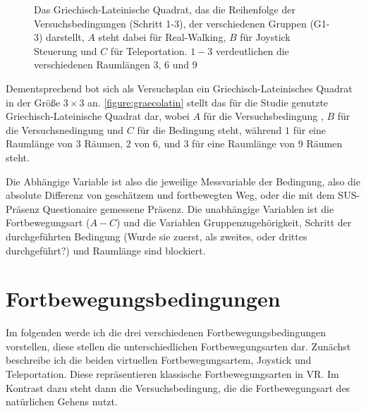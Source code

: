     \begin{figure}[!h]
        \centering
        

        \caption{Das Griechisch-Lateinische Quadrat, das die Reihenfolge der Versuchsbedingungen (Schritt 1-3), der verschiedenen Gruppen (G1-3) darstellt, $A$ steht dabei für Real-Walking, $B$ für Joystick Steuerung und $C$ für Teleportation. $1-3$ verdeutlichen die verschiedenen Raumlängen $3$, $6$ und $9$}\label{figure:graecolatin}
    \end{figure}

    Dementsprechend bot sich als Versuchsplan ein Griechisch-Lateinisches Quadrat in der Größe $3 \times 3$ an. \autoref{figure:graecolatin} stellt das für die Studie genutzte Griechisch-Lateinische Quadrat dar, wobei $A$ für die Versuchsbedingung , $B$ für die Versuchsnedingung  und $C$ für die Bedingung  steht, während $1$ für eine Raumlänge von 3 Räumen, $2$ von 6, und $3$ für eine Raumlänge von 9 Räumen steht.

    Die Abhängige Variable ist also die jeweilige Messvariable der Bedingung, also die absolute Differenz von geschätzem und fortbewegten Weg, oder die mit dem SUS-Präsenz Questionaire gemessene Präsenz. Die unabhängige Variablen ist die Fortbewegungsart ($A-C$) und die Variablen Gruppenzugehörigkeit, Schritt der durchgeführten Bedingung (Wurde sie zuerst, als zweites, oder drittes durchgeführt?) und Raumlänge sind blockiert. %

    \section{Fortbewegungsbedingungen}\label{sec:conditions}
        Im folgenden werde ich die drei verschiedenen Fortbewegungsbedingungen vorstellen, diese stellen die unterschiedlichen Fortbewegungsarten dar. Zunächst beschreibe ich die beiden virtuellen Fortbewegungsartem, Joystick und Teleportation. Diese repräsentieren klassische Fortbewegungsarten in VR. Im Kontrast dazu steht dann die Versuchsbedingung, die die Fortbewegungsart des natürlichen Gehens nutzt.

